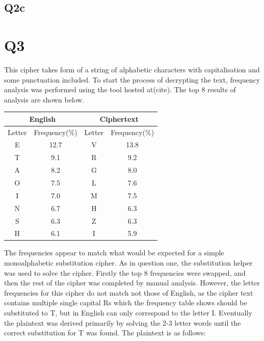 \documentclass[pdflatex, a4paper,12pt]{article}
\begin{document}
\subsection{Q2c}


\section{Q3}

This cipher takes form of a string of alphabetic characters with capitalisation
and some punctuation included. To start the process of decrypting the text, frequency
analysis was performed using the tool hosted at(cite). The top 8 results of
analysis are shown below.

\begin{center}
\begin{tabular}{cc|cc}
    \multicolumn{2}{c|}{English} & \multicolumn{2}{c}{Ciphertext} \\
    \hline
    Letter & Frequency(\%) & Letter & Frequency(\%) \\
    \hline
    E                & 12.7         & V      & 13.8  \\
    T                & 9.1          & R      & 9.2   \\
    A                & 8.2          & G      & 8.0   \\
    O                & 7.5          & L      & 7.6   \\
    I                & 7.0          & M      & 7.5   \\
    N                & 6.7          & H      & 6.3   \\
    S                & 6.3          & Z      & 6.3   \\
    H                & 6.1          & I      & 5.9   \\
\end{tabular}
\end{center}

The frequencies appear to match what would be expected for a simple
monoalphabetic substitution cipher. As in question one, the substitution helper
was used to solve the cipher.
Firstly the top 8 frequencies were swapped, and then the rest of the cipher was
completed by manual analysis. However, the letter frequencies for this cipher
do not match not those of English, as the cipher text contains multiple single capital
Rs which the frequency table shows should be substituted to T, but in English
can only correspond to the letter I. Eventually the plaintext was derived
primarily by solving the 2-3 letter words until the correct substitution for T
was found. The plaintext is as follows:
\end{document}
